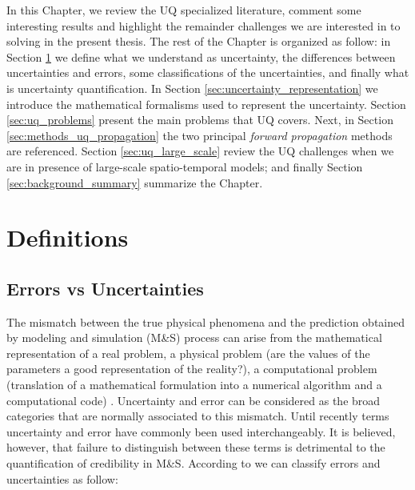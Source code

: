 In this Chapter, we review the UQ specialized literature, comment some interesting results and highlight the remainder challenges we are interested in to solving in the present thesis. The rest of the Chapter is organized as follow: in Section \ref{sec:definitions} we define what we understand as uncertainty, the differences between uncertainties and errors, some classifications of the uncertainties, and finally what is uncertainty quantification. In Section \ref{sec:uncertainty_representation} we introduce the mathematical formalisms used to represent the uncertainty. Section \ref{sec:uq_problems} present the main problems that UQ covers. Next, in Section \ref{sec:methods_uq_propagation} the two principal \textit{forward propagation} methods are referenced. Section \ref{sec:uq_large_scale} review the UQ challenges when we are in presence of large-scale spatio-temporal models; and finally Section \ref{sec:background_summary} summarize the Chapter.

\section{Definitions}\label{sec:definitions}
\subsection{Errors vs Uncertainties}

The mismatch between the true physical phenomena and the prediction obtained by modeling and simulation (M\&S) process can arise from the mathematical representation of a real problem, a physical problem (are the values of the parameters a good representation of the reality?), a computational problem (translation of a mathematical formulation into a numerical algorithm and a computational code) \cite{Lavril2015}. Uncertainty and error can be considered as the broad categories  that  are  normally  associated to this mismatch. Until recently terms  uncertainty  and error  have  commonly  been  used  interchangeably.  It is believed, however, that failure to distinguish between these terms is detrimental to the quantification of credibility in M\&S. According to \cite{Alvin1998} we can classify errors and uncertainties as follow: 

